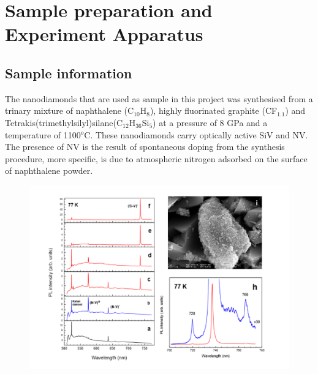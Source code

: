 \chapter[Sample preparation and Experiment Apparatus]{Sample preparation and Experiment Apparatus} %

\label{Chapter2} %

\section{Sample information}
The nanodiamonds that are used as sample in this project was synthesised from a trinary mixture of naphthalene (C$_{10}$H$_{8}$), highly fluorinated graphite (CF$_{1.1}$) and Tetrakis(trimethylsilyl)silane(C$_{12}$H$_{36}$Si$_{5}$) at a pressure of 8 GPa and a temperature of 1100$^{o}$C. These nanodiamonds carry optically active SiV and NV. The presence of NV is the result of spontaneous doping from the synthesis procedure, more specific, is due to atmospheric nitrogen adsorbed on the surface of naphthalene powder.\citep{davydov_production_2014}
\begin{figure}[h]
\centering
\includegraphics[width=1\linewidth]{Figures/pic/diamondinfo}
\caption{}
\label{fig:diamondinfo}
\end{figure}
\FloatBarrier


